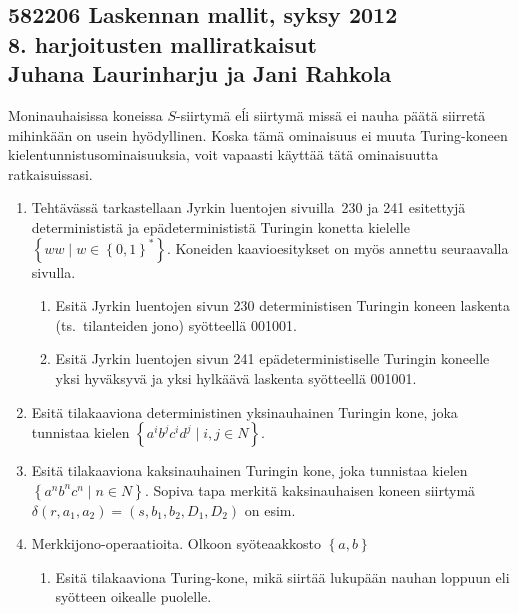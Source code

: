 \documentclass[finnish,11pt,draft]{article}
\newcommand{\set}[1]{{\left\{ #1 \right\}}}
\begin{document}
\subsection*{582206 Laskennan mallit, syksy 2012 \\
  \textmd{8. harjoitusten malliratkaisut \\
    Juhana Laurinharju ja Jani Rahkola}}

Moninauhaisissa koneissa $S$-siirtymä eĺi siirtymä missä ei nauha päätä
siirretä mihinkään on usein hyödyllinen. Koska tämä ominaisuus ei muuta
Turing-koneen kielentunnistusominaisuuksia, voit vapaasti käyttää tätä
ominaisuutta ratkaisuissasi.

\begin{enumerate}
\item
  Tehtävässä tarkastellaan Jyrkin luentojen sivuilla~230 ja 241 esitettyjä
  determinististä ja epädeterminististä Turingin konetta kielelle $\set{ww\mid
    w\in\set{0,1}^\ast}$. Koneiden kaavioesitykset on myös annettu seuraavalla
  sivulla.
\begin{enumerate}
\item
Esitä Jyrkin luentojen sivun 230 deterministisen Turingin koneen
laskenta (ts.\ tilanteiden jono) syötteellä 001001.
\item
Esitä Jyrkin luentojen sivun 241 epädeterministiselle Turingin koneelle
yksi hyväksyvä ja yksi hylkäävä laskenta
syötteellä 001001.
\end{enumerate}

\item
Esitä tilakaaviona deterministinen yksinauhainen
Turingin kone, joka tunnistaa kielen
$\set{a^ib^jc^id^j\mid i,j\in N}$.




\item
Esitä tilakaaviona kaksinauhainen Turingin kone, joka tunnistaa
kielen $\set{a^nb^nc^n\mid n\in N}$.
Sopiva tapa merkitä kaksinauhaisen koneen siirtymä
$\delta(r,a_1,a_2)=(s,b_1,b_2,D_1,D_2)$ on esim.
\newcommand{\twotrans}
{\left[\begin{array}{c}
a_1\rightarrow b_1,D_1\\
a_2\rightarrow b_2,D_2
\end{array}\right]}
\bigskip


\item Merkkijono-operaatioita. Olkoon syöteaakkosto $\set{a,b}$
\begin{enumerate}
\item 
Esitä tilakaaviona Turing-kone, mikä siirtää lukupään nauhan loppuun eli syötteen oikealle puolelle.


\end{enumerate}
\end{enumerate}
\end{document}
